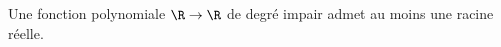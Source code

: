 Une fonction polynomiale $\R \to \R$ de degré impair admet au moins une racine réelle.

\begin{reponses}
\end{reponses}

